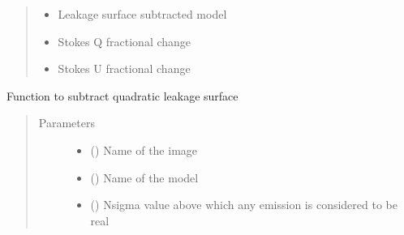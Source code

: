 \documentclass[letterpaper,10pt,english]{sphinxmanual}
\begin{document}
\begin{fulllineitems}
\begin{fulllineitems}
\begin{quote}
\begin{description}
\begin{itemize}
\item {} 
\sphinxAtStartPar
{} \textendash{} Leakage surface subtracted model

\item {} 
\sphinxAtStartPar
{} \textendash{} Stokes Q fractional change

\item {} 
\sphinxAtStartPar
{} \textendash{} Stokes U fractional change

\end{itemize}


\end{description}\end{quote}

\end{fulllineitems}


\begin{fulllineitems}
\label{\detokenize{paircars:paircars.fullpol_selfcal_LTS.PolSelfcal.subtract_stokesV_solar_leakage_surface}}
\sphinxAtStartPar
Function to subtract quadratic leakage surface
\begin{quote}\begin{description}
\item[{Parameters}] \leavevmode\begin{itemize}
\item {} 
\sphinxAtStartPar
{} () \textendash{} Name of the image

\item {} 
\sphinxAtStartPar
{} () \textendash{} Name of the model

\item {} 
\sphinxAtStartPar
{} () \textendash{} N\sphinxhyphen{}sigma value above which any emission is considered to be real


\end{itemize}
\end{description}
\end{quote}
\end{fulllineitems}
\end{fulllineitems}
\end{document}
